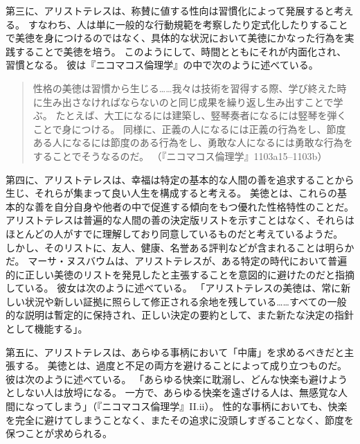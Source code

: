 \documentclass[paper=a4,book,openany]{jlreq}
\begin{document}
第三に、アリストテレスは、称賛に値する性向は習慣化によって発展すると考える。
すなわち、人は単に一般的な行動規範を考察したり定式化したりすることで美徳を身につけるのではなく、具体的な状況において美徳にかなった行為を実践することで美徳を培う。
このようにして、時間とともにそれが内面化され、習慣となる。
彼は『ニコマコス倫理学』の中で次のように述べている。

\begin{quote}
  性格の美徳は習慣から生じる……我々は技術を習得する際、学び終えた時に生み出さなければならないのと同じ成果を繰り返し生み出すことで学ぶ。
たとえば、大工になるには建築し、竪琴奏者になるには竪琴を弾くことで身につける。
同様に、正義の人になるには正義の行為をし、節度ある人になるには節度のある行為をし、勇敢な人になるには勇敢な行為をすることでそうなるのだ。
（『ニコマコス倫理学』1103a15--1103b）
\end{quote}

第四に、アリストテレスは、幸福は特定の基本的な人間の善を追求することから生じ、それらが集まって良い人生を構成すると考える。
美徳とは、これらの基本的な善を自分自身や他者の中で促進する傾向をもつ優れた性格特性のことだ。
アリストテレスは普遍的な人間の善の決定版リストを示すことはなく、それらはほとんどの人がすでに理解しており同意しているものだと考えているようだ。
しかし、そのリストに、友人、健康、名誉ある評判などが含まれることは明らかだ。
マーサ・ヌスバウムは、アリストテレスが、ある特定の時代において普遍的に正しい美徳のリストを発見したと主張することを意図的に避けたのだと指摘している。
彼女は次のように述べている。
「アリストテレスの美徳は、常に新しい状況や新しい証拠に照らして修正される余地を残している……すべての一般的な説明は暫定的に保持され、正しい決定の要約として、また新たな決定の指針として機能する」\citep[pp.259--260]{nussbaum93:_non_relat_virtues}。

第五に、アリストテレスは、あらゆる事柄において「中庸」を求めるべきだと主張する。
美徳とは、過度と不足の両方を避けることによって成り立つものだ。
彼は次のように述べている。
「あらゆる快楽に耽溺し、どんな快楽も避けようとしない人は放埒になる。
一方で、あらゆる快楽を遠ざける人は、無感覚な人間になってしまう」（『ニコマコス倫理学』II.ii）。
性的な事柄においても、快楽を完全に避けてしまうことなく、またその追求に没頭しすぎることなく、節度を保つことが求められる。
\end{document}
